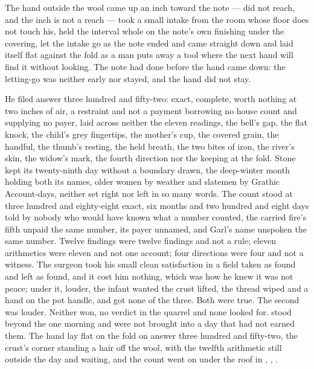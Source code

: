 The hand outside the wool came up an inch toward the note --- did not reach, and the inch is not a reach --- took a small intake from the room whose floor does not touch his, held the interval whole on the note's own finishing under the covering, let the intake go as the note ended and came straight down and laid itself flat against the fold as a man puts away a tool where the next hand will find it without looking. The note had done before the hand came down: the letting-go was neither early nor stayed, and the hand did not stay.

He filed answer three hundred and fifty-two: exact, complete, worth nothing at two inches of air, a restraint and not a payment borrowing no house count and supplying no payer, laid across neither the eleven readings, the bell's gap, the flat knock, the child's grey fingertips, the mother's cup, the covered grain, the handful, the thumb's resting, the held breath, the two bites of iron, the river's skin, the widow's mark, the fourth direction nor the keeping at the fold. Stone kept its twenty-ninth day without a boundary drawn, the deep-winter month holding both its names, older women by weather and slatemen by Grathic Account-days, neither set right nor left in so many words. The count stood at three hundred and eighty-eight exact, six months and two hundred and eight days told by nobody who would have known what a number counted, the carried fire's fifth unpaid the same number, its payer unnamed, and Garl's name unspoken the same number. Twelve findings were twelve findings and not a rule; eleven arithmetics were eleven and not one account; four directions were four and not a witness. The surgeon took his small clean satisfaction in a field taken as found and left as found, and it cost him nothing, which was how he knew it was not peace; under it, louder, the infant wanted the crust lifted, the thread wiped and a hand on the pot handle, and got none of the three. Both were true. The second was louder. Neither won, no verdict in the quarrel and none looked for.  stood beyond the one morning and were not brought into a day that had not earned them. The hand lay flat on the fold on answer three hundred and fifty-two, the crust's corner standing a hair off the wool, with the twelfth arithmetic still outside the day and waiting, and the count went on under the roof in , , .
